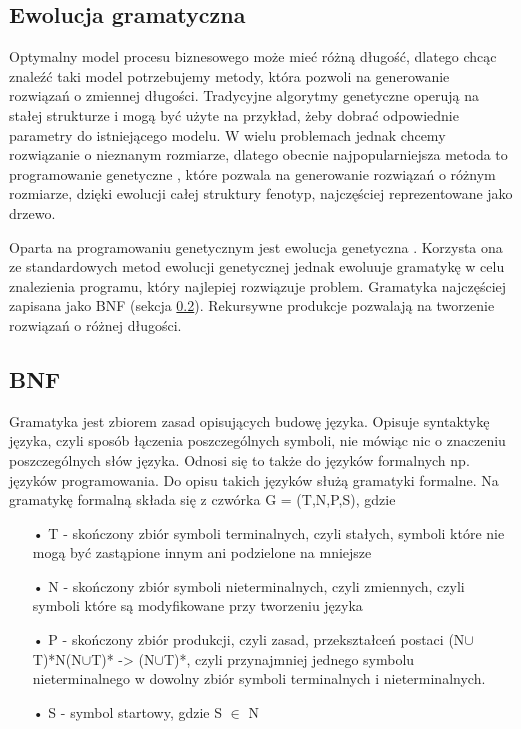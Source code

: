 \subsection{Ewolucja gramatyczna}
Optymalny model procesu biznesowego może mieć różną długość, dlatego chcąc znaleźć taki model potrzebujemy metody, która pozwoli na generowanie rozwiązań o zmiennej długości. Tradycyjne algorytmy genetyczne operują na stałej strukturze i mogą być użyte na przykład, żeby dobrać odpowiednie parametry do istniejącego modelu. W wielu problemach jednak chcemy rozwiązanie o nieznanym rozmiarze, dlatego obecnie najpopularniejsza metoda to programowanie genetyczne \cite{Koza:1990:pat-GAsp}\cite{10.5555/138936}, które pozwala na generowanie rozwiązań o różnym rozmiarze, dzięki ewolucji całej struktury fenotyp, najczęściej reprezentowane jako drzewo.

Oparta na programowaniu genetycznym jest ewolucja genetyczna \cite{ryan_collins_neill_1998}. Korzysta ona ze standardowych metod ewolucji genetycznej jednak ewoluuje gramatykę w celu znalezienia programu, który najlepiej rozwiązuje problem. Gramatyka najczęściej zapisana jako BNF (sekcja \ref{sec:BNF}). Rekursywne produkcje pozwalają na tworzenie rozwiązań o różnej długości. 

\subsection{BNF}
\label{sec:BNF}
Gramatyka jest zbiorem zasad opisujących budowę języka. Opisuje syntaktykę języka, czyli sposób łączenia poszczególnych symboli, nie mówiąc nic o znaczeniu poszczególnych słów języka. Odnosi się to także do języków formalnych np. języków programowania. Do opisu takich języków służą gramatyki formalne. Na gramatykę formalną składa się z czwórka G = (T,N,P,S), gdzie 

\begin{itemize}
  \item[•] T - skończony zbiór symboli terminalnych, czyli stałych, symboli które nie mogą być zastąpione innym ani podzielone na mniejsze 
  \item[•] N - skończony zbiór symboli nieterminalnych, czyli zmiennych, czyli symboli które są modyfikowane przy tworzeniu języka
  \item[•] P - skończony zbiór produkcji, czyli zasad, przekształceń postaci (N$\cup$T)*N(N$\cup$T)* -> (N$\cup$T)*, czyli przynajmniej jednego symbolu nieterminalnego w dowolny zbiór symboli terminalnych i nieterminalnych.
  \item[•] S - symbol startowy, gdzie S $\in$ N
\end{itemize}


